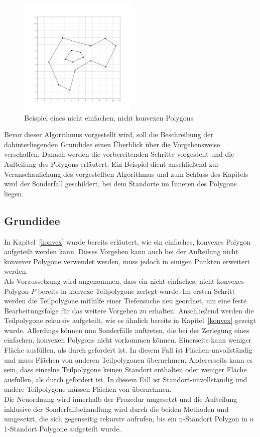 \documentclass[ngerman]{seminarbeitrag}
\begin{document}
\begin{figure}[h]
    \includegraphics[width=0.50\textwidth]{./Abbildungen/4.png}
    \centering
    \caption{Beispiel eines nicht einfachen, nicht konvexen Polygons}
    \label{viertes beispiel}
\end{figure}
Bevor dieser Algorithmus vorgestellt wird, soll die Beschreibung der dahinterliegenden Grundidee einen Überblick über die Vorgehensweise verschaffen. Danach werden die vorbereitenden Schritte vorgestellt und die Aufteilung des Polygons erläutert. Ein Beispiel dient anschließend zur Veranschaulichung des vorgestellten Algorithmus und zum Schluss des Kapitels wird der Sonderfall geschildert, bei dem Standorte im Inneren des Polygons liegen.

\subsection{Grundidee}\label{grundidee nicht konvex}
In Kapitel~\ref{konvex} wurde bereits erläutert, wie ein einfaches, konvexes Polygon aufgeteilt werden kann. Dieses Vorgehen kann auch bei der Aufteilung nicht konvexer Polygone verwendet werden, muss jedoch in einigen Punkten erweitert werden.\\
Als Voraussetzung wird angenommen, dass ein nicht einfaches, nicht konvexes Polygon $P$ bereits in konvexe Teilpolygone \cpp zerlegt wurde. Im ersten Schritt werden die Teilpolygone mithilfe einer Tiefensuche neu geordnet, um eine feste Bearbeitungsfolge für das weitere Vorgehen zu erhalten. Anschließend werden die Teilpolygone rekursiv aufgeteilt, wie es ähnlich bereits in Kapitel~\ref{konvex} gezeigt wurde. Allerdings können nun Sonderfälle auftreten, die bei der Zerlegung eines einfachen, konvexen Polygons nicht vorkommen können. Einerseits kann \cpi weniger Fläche ausfüllen, als durch gefordert ist. In diesem Fall ist \cpi Flächen-unvollständig und muss Flächen von anderen Teilpolygonen übernehmen. Andererseits kann es sein, dass einzelne Teilpolygone keinen Standort enthalten oder weniger Fläche ausfüllen, als durch gefordert ist. In diesem Fall ist \cpi Standort-unvollständig und andere Teilpolygone müssen Flächen von \cpi übernehmen.\\
Die Neuordnung wird innerhalb der Prozedur \ord umgesetzt und die Aufteilung inklusive der Sonderfallbehandlung wird durch die beiden Methoden \noncon und \daa umgesetzt, die sich gegenseitig rekursiv aufrufen, bis ein n-Standort Polygon in $n$ 1-Standort Polygone aufgeteilt wurde.
\end{document}
